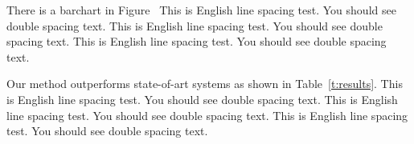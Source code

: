 There is a barchart in Figure~%
This is English line spacing test. You should see double spacing text.
This is English line spacing test. You should see double spacing text.
This is English line spacing test. You should see double spacing text.

%

Our method outperforms state-of-art systems as shown in Table~\ref{t:results}.
This is English line spacing test. You should see double spacing text.
This is English line spacing test. You should see double spacing text.
This is English line spacing test. You should see double spacing text.



